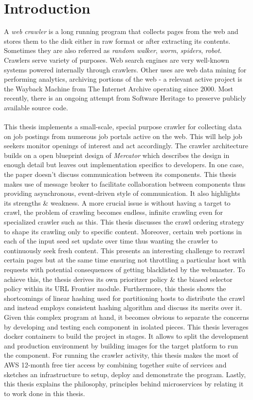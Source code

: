 \chapter{Introduction}
A \textit{web crawler} is a long running program that collects pages from the web and stores them to the
disk either in raw format or after extracting its contents. Sometimes they are also referred as
\textit{random walker}, \textit{worm}, \textit{spiders}, \textit{robot}. Crawlers serve variety of
purposes. Web search engines are very well-known systems powered internally through crawlers.
Other uses are web data mining for performing analytics, archiving portions of the web - a
relevant active project is the Wayback Machine from The Internet Archive\cite{netarchive} operating since 2000. Most recently,
there is an ongoing attempt from Software Heritage\cite{swheritage} to preserve publicly available
source code.
\\
\\
This thesis implements a small-scale, special purpose crawler for collecting data on job postings from
numerous job portals active on the web. This will help job seekers monitor openings of interest and
act accordingly. The crawler architecture builds on a open blueprint design of \textit{Mercator}\cite{mercator} which describes the design in enough detail but leaves out implementation specifics to developers. In
one case, the paper doesn't discuss communication between its components. This thesis makes use of message
broker to facilitate collaboration between components thus providing asynchronous, event-driven style of
communication. It also highlights its strengths \& weakness. A more crucial issue is without having a target to crawl, the problem of crawling becomes endless, infinite crawling even for specialized crawler such as this. This thesis discusses the crawl ordering strategy to shape its crawling only to specific content. Moreover, certain web portions in each of the input seed set update over time thus wanting the crawler to continuously seek fresh content. This presents an interesting challenge to recrawl certain pages but at the same time ensuring not throttling a particular host with requests with potential consequences of getting blacklisted by the webmaster. To achieve this, the thesis derives its own prioritzer policy \& the biased selector policy within its URL Frontier module. Furthermore, this thesis shows the shortcomings of linear hashing used for partitioning hosts to distribute the crawl and instead employs consistent hashing\cite{consisthash} algorithm and discuss its merits over it. Given this complex program at hand, it becomes
obvious to separate the concerns by developing and testing each component in isolated pieces. This thesis leverages docker containers to build the project in stages. It allows to split the development and production environment by building images for the target platform to run the component. For running the crawler activity, this thesis
makes the most of AWS 12-month free tier access by combining together suite of services and sketches an infrastructure to setup, deploy and demonstrate the program. Lastly, this thesis explains the philosophy, principles behind microservices\cite{microservices} by relating it to work done in this thesis.


